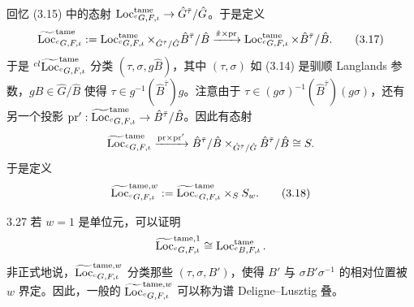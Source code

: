 回忆 (3.15) 中的态射 $\operatorname{Loc}^{\mathrm{tame}}_{{}^{c}G,F,\iota}\to\hat G^{\bar\tau}/\hat G$。于是定义
\begin{equation}
\widetilde{\operatorname{Loc}}^{\mathrm{tame}}_{{}^{c}G,F,\iota}:=\operatorname{Loc}^{\mathrm{tame}}_{{}^{c}G,F,\iota}\times_{\hat G^{\bar\tau}/\hat G}\hat B^{\bar\tau}/\hat B\xrightarrow{\tilde\pi\times\mathrm{pr}}\operatorname{Loc}^{\mathrm{tame}}_{{}^{c}G,F,\iota}\times\hat B^{\bar\tau}/\hat B. \tag{3.17}
\end{equation}
于是 ${}^{cl}\widetilde{\operatorname{Loc}}^{\mathrm{tame}}_{{}^{c}G,F,\iota}$ 分类 $(\tau,\sigma,g\hat B)$，其中 $(\tau,\sigma)$ 如 (3.14) 是驯顺 Langlands 参数，$g\hat B\in\hat G/\hat B$ 使得 $\tau\in g^{-1}(\hat B^{\bar\tau})g$。注意由于 $\tau\in(g\sigma)^{-1}(\hat B^{\bar\tau})(g\sigma)$，还有另一个投影 $\mathrm{pr}':\widetilde{\operatorname{Loc}}^{\mathrm{tame}}_{{}^{c}G,F,\iota}\to\hat B^{\bar\tau}/\hat B$。因此有态射
\[
\widetilde{\operatorname{Loc}}^{\mathrm{tame}}_{{}^{c}G,F,\iota}\xrightarrow{\mathrm{pr}\times\mathrm{pr}'}\hat B^{\bar\tau}/\hat B\times_{\hat G^{\bar\tau}/\hat G}\hat B^{\bar\tau}/\hat B\cong S.
\]
于是定义
\begin{equation}
\widetilde{\operatorname{Loc}}^{\mathrm{tame},w}_{{}^{c}G,F,\iota}:=\widetilde{\operatorname{Loc}}^{\mathrm{tame}}_{{}^{c}G,F,\iota}\times_{S}S_w. \tag{3.18}
\end{equation}

\begin{rem}{3.27}
若 $w=1$ 是单位元，可以证明
\[
\widetilde{\operatorname{Loc}}^{\mathrm{tame},1}_{{}^{c}G,F,\iota}\cong\operatorname{Loc}^{\mathrm{tame}}_{{}^{c}B,F,\iota}.
\]
非正式地说，$\widetilde{\operatorname{Loc}}^{\mathrm{tame},w}_{{}^{c}G,F,\iota}$ 分类那些 $(\tau,\sigma,B')$，使得 $B'$ 与 $\sigma B'\sigma^{-1}$ 的相对位置被 $w$ 界定。因此，一般的 $\widetilde{\operatorname{Loc}}^{\mathrm{tame},w}_{{}^{c}G,F,\iota}$ 可以称为谱 Deligne–Lusztig 叠。
\end{rem}

